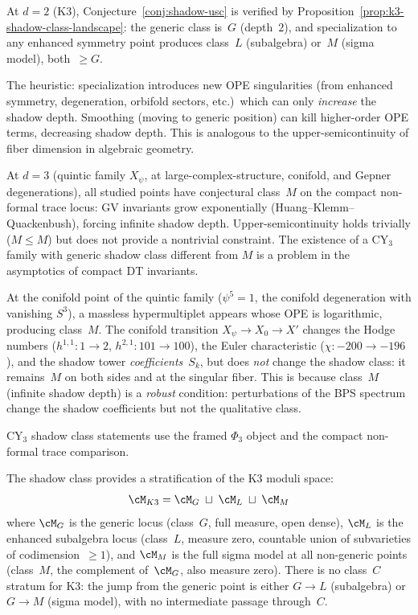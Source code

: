 \begin{remark}
\label{rem:shadow-usc-evidence}
At $d = 2$ (K3), Conjecture~\ref{conj:shadow-usc} is verified by
Proposition~\ref{prop:k3-shadow-class-landscape}: the generic class
is~$G$ (depth~$2$), and specialization to any enhanced symmetry point
produces class~$L$ (subalgebra) or~$M$ (sigma model), both~$\geq G$.

The heuristic: specialization introduces new OPE singularities (from
enhanced symmetry, degeneration, orbifold sectors, etc.)\ which can
only \emph{increase} the shadow depth. Smoothing (moving to generic
position) can kill higher-order OPE terms, decreasing shadow depth.
This is analogous to the upper-semicontinuity of fiber dimension
in algebraic geometry.

At $d = 3$ (quintic family $X_\psi$, at large-complex-structure,
conifold, and Gepner degenerations), all studied points have conjectural
class~$M$ on the compact non-formal trace locus: GV invariants grow
exponentially (Huang--Klemm--Quackenbush), forcing infinite shadow
depth. Upper-semicontinuity holds trivially ($M \leq M$) but does
not provide a nontrivial constraint. The existence of a CY$_3$ family
with generic shadow class different from $M$ is a problem in the
asymptotics of compact DT invariants.
\end{remark}

\begin{remark}
\label{rem:conifold-shadow-class}
At the conifold point of the quintic family ($\psi^5 = 1$,
the conifold degeneration with vanishing $S^3$), a massless
hypermultiplet appears whose OPE is logarithmic, producing class~$M$.
The conifold transition $X_\psi \to X_0 \to X'$ changes the Hodge
numbers ($h^{1,1}: 1 \to 2$, $h^{2,1}: 101 \to 100$), the Euler
characteristic ($\chi: {-}200 \to {-}196$), and the shadow tower
\emph{coefficients}~$S_k$, but does \emph{not} change the shadow
class: it remains~$M$ on both sides and at the singular fiber.
This is because class~$M$ (infinite shadow depth) is a
\emph{robust} condition: perturbations of the BPS spectrum
change the shadow coefficients but not the qualitative
class.

CY$_3$ shadow class statements use the framed $\Phi_3$ object and the
compact non-formal trace comparison.
\end{remark}

\begin{remark}
\label{rem:k3-moduli-stratification}
The shadow class provides a stratification of the K3 moduli space:
\[
 \cM_{K3} = \cM_G \;\sqcup\; \cM_L \;\sqcup\; \cM_M
\]
where $\cM_G$ is the generic locus (class~$G$, full measure, open dense),
$\cM_L$ is the enhanced subalgebra locus (class~$L$, measure zero,
countable union of subvarieties of codimension~$\geq 1$), and
$\cM_M$ is the full sigma model at all non-generic points
(class~$M$, the complement of~$\cM_G$, also measure zero).
There is no class~$C$ stratum for K3: the jump from the generic
point is either $G \to L$ (subalgebra) or $G \to M$ (sigma model),
with no intermediate passage through~$C$.
\end{remark}

